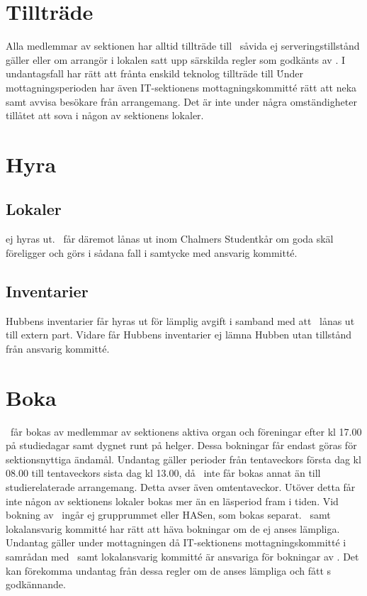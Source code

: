\documentclass[11pt, includeaddress]{classes/cthit}
\begin{document}
\section{Tillträde}
Alla medlemmar av sektionen har alltid tillträde till \HUBBEN\ såvida ej serveringstillstånd gäller eller
om arrangör i lokalen satt upp särskilda regler som godkänts av \STYRIT. I undantagsfall har \STYRIT rätt
att frånta enskild teknolog tillträde till \HUBBEN\. Under mottagningsperioden har även IT-sektionens mottagningskommitté rätt att neka samt avvisa besökare från arrangemang.
Det är inte under några omständigheter tillåtet att sova i någon av sektionens lokaler.


\section{Hyra}
\subsection{Lokaler}
\HUBBEN{} ej hyras ut. \HUBBEN\ får däremot lånas ut inom Chalmers Studentkår om goda skäl
föreligger och görs i sådana fall i samtycke med ansvarig kommitté.

\subsection{Inventarier}
Hubbens inventarier får hyras ut för lämplig avgift i samband med att \HUBBEN\ lånas ut till extern part.
Vidare får Hubbens inventarier ej lämna Hubben utan tillstånd från ansvarig kommitté.


\section{Boka}
\HUBBEN\ får bokas av medlemmar av sektionens aktiva organ och föreningar efter kl 17.00 på
studiedagar samt dygnet runt på helger. Dessa bokningar får endast göras för sektionsnyttiga ändamål.
Undantag gäller perioder från tentaveckors första dag kl 08.00 till tentaveckors sista dag kl 13.00, då
\HUBBEN\ inte får bokas annat än till studierelaterade arrangemang. Detta avser även omtentaveckor.
Utöver detta får inte någon av sektionens lokaler bokas mer än en läsperiod fram i tiden.
Vid bokning av \HUBBEN\ ingår ej grupprummet eller HASen, som bokas separat. \STYRIT\ samt
lokalansvarig kommitté har rätt att häva bokningar om de ej anses lämpliga. Undantag gäller under mottagningen då IT-sektionens mottagningskommitté i samrådan med \STYRIT\ samt lokalansvarig kommitté är ansvariga för bokningar av \HUBBEN.
Det kan förekomma undantag från dessa regler om de anses lämpliga och fått \STYRIT{}s godkännande.
\end{document}
